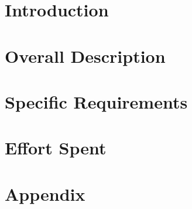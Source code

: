 \documentclass[a4paper,12pt]{report}
\begin{document}
\tableofcontents

\chapter{Introduction} \label{ch:Introduction}

\clearpage

\chapter{Overall Description}
%
\clearpage

\chapter{Specific Requirements}
%
\clearpage

\chapter{Effort Spent}

\clearpage

\appendix
\chapter{Appendix}

%
\end{document}
